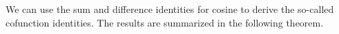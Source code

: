 









We can  use the sum and difference identities for cosine to derive the so-called cofunction identities. The results are summarized in the following theorem.


